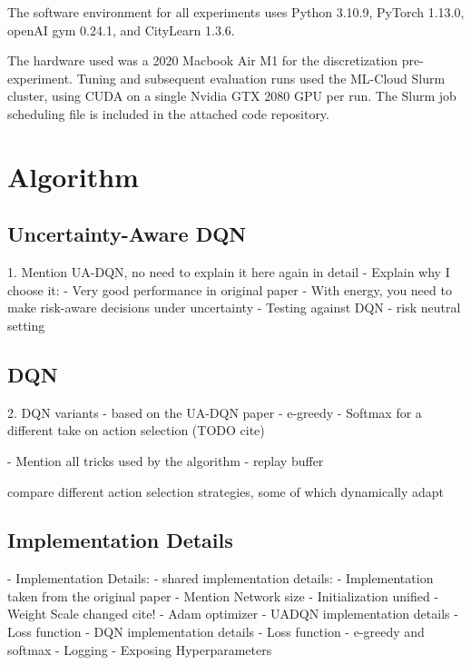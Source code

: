 The software environment for all experiments uses Python 3.10.9, PyTorch 1.13.0, openAI gym 0.24.1, and CityLearn 1.3.6.

The hardware used was a 2020 Macbook Air M1 for the discretization pre-experiment. Tuning and subsequent evaluation runs used the ML-Cloud Slurm cluster, using CUDA on a single Nvidia GTX 2080 GPU per run. The Slurm job scheduling file is included in the attached code repository.


\section{Algorithm}

\subsection{Uncertainty-Aware DQN}
1. Mention UA-DQN, no need to explain it here again in detail
    - Explain why I choose it:
        - Very good performance in original paper
        - With energy, you need to make risk-aware decisions under uncertainty
    - Testing against DQN
    - risk neutral setting

\subsection{DQN}
2. DQN variants
    - based on the UA-DQN paper
    - e-greedy
    - Softmax for a different take on action selection (TODO cite)

    - Mention all tricks used by the algorithm
        - replay buffer

    \cite{cruz2018ActionSelectionMethods} compare different action selection strategies, some of which dynamically adapt 

\subsection{Implementation Details}
- Implementation Details:
    - shared implementation details:
        - Implementation taken from the original paper
        - Mention Network size
        - Initialization unified
        - Weight Scale changed cite!
        - Adam optimizer
    - UADQN implementation details
        - Loss function
    - DQN implementation details
        - Loss function
        - e-greedy and softmax
    - Logging
    - Exposing Hyperparameters



